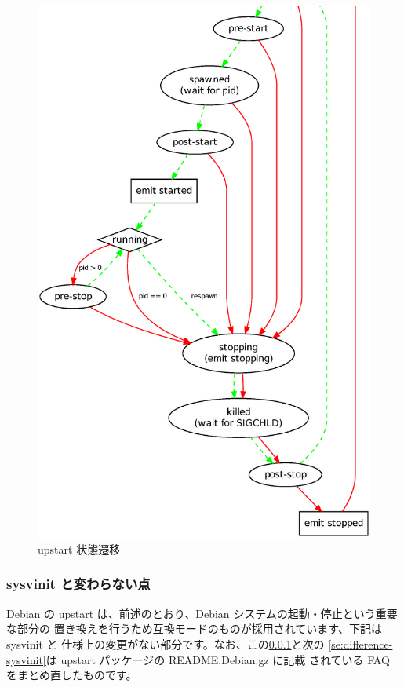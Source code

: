 \documentclass[mingoth,a4paper]{jsarticle}
\begin{document}
\begin{figure}[h]
\begin{center}
\caption{upstart 状態遷移}
\includegraphics[height=0.7\hsize]{image201002/states.eps}
\end{center}
\end{figure}

\subsubsection{sysvinit と変わらない点}
\label{se:same-sysvinit}

Debian の upstart は、前述のとおり、Debian システムの起動・停止という重要な部分の
置き換えを行うため互換モードのものが採用されています、下記は sysvinit と
仕様上の変更がない部分です。なお、この\ref{se:same-sysvinit}と次の
\ref{se:difference-sysvinit}は upstart パッケージの README.Debian.gz に記載
されている FAQ をまとめ直したものです。
\end{document}
